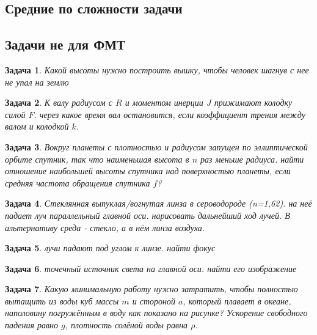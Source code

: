 \documentclass[12pt]{article}
\theoremstyle{break}
\newtheorem{problem}{Задача}[subsection]
\begin{document}
\subsection{Средние по сложности задачи}


\subsection{Задачи не для ФМТ}



\begin{problem}
Какой высоты нужно построить вышку, чтобы человек шагнув с нее не упал на землю
\end{problem}


\begin{problem}
К валу радиусом с $R$ и моментом инерции $J$ прижимают колодку силой $F$. через какое время вал остановится, если коэффициент трения между валом и колодкой $k$.
\end{problem}


\begin{problem}
Вокруг планеты с плотностью и радиусом запущен по эллиптической орбите спутник, так что наименьшая высота в $n$ раз меньше радиуса. найти отношение наибольшей высоты спутника над поверхностью планеты, если средняя частота обращения спутника $f$?
\end{problem}


\begin{problem}
Стеклянная выпуклая/вогнутая линза в сероводороде (n=1,62). на неё падает луч параллельный главной оси. нарисовать дальнейший ход лучей. В альтернативу среда - стекло, а в нём линза воздуха.
\end{problem}


\begin{problem}
лучи падают под углом к линзе. найти фокус
\end{problem}


\begin{problem}
точечный источник света на главной оси. найти его изображение
\end{problem}


\begin{problem}
Какую минимальную работу нужно затратить, чтобы полностью вытащить из воды куб массы $m$ и стороной $a$, который плавает в океане, наполовину погружённым в воду как показано на рисунке? Ускорение свободного падения равно $g$, плотность солёной воды равна $\rho$.
\end{problem}





%
%
\end{document}
